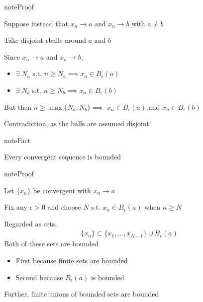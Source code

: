 \documentclass[letterpaper,10pt,english]{jupyterBook}
\begin{document}
\begin{sphinxadmonition}{note}{Proof}

\sphinxAtStartPar
Suppose instead that \(x_n \to a \text{ and } x_n \to b \text{ with } a \ne b \)

\sphinxAtStartPar
Take disjoint \(\epsilon\)\sphinxhyphen{}balls around \(a\) and \(b\)

\begin{figure}[H]
\centering

\noindent{}
\end{figure}

\sphinxAtStartPar
Since \(x_n \to a\) and \(x_n \to b\),
\begin{itemize}
\item {} 
\sphinxAtStartPar
\(\exists \; N_a\) s.t. \(n \geq N_a \implies x_n \in B_{\epsilon}(a)\)

\item {} 
\sphinxAtStartPar
\(\exists \; N_b\) s.t. \(n \geq N_b \implies x_n \in B_{\epsilon}(b)\)

\end{itemize}

\sphinxAtStartPar
But then \(n \geq \max\{N_a, N_b\} \implies \) \(x_n \in B_{\epsilon}(a)\) and \(x_n \in B_{\epsilon}(b)\)

\sphinxAtStartPar
Contradiction, as the balls are assumed disjoint
\end{sphinxadmonition}

\begin{sphinxadmonition}{note}{Fact}

\sphinxAtStartPar
Every convergent sequence is bounded
\end{sphinxadmonition}

\begin{sphinxadmonition}{note}{Proof}

\sphinxAtStartPar
Let \(\{x_n\}\) be convergent with \(x_n \to a\)

\sphinxAtStartPar
Fix any \(\epsilon > 0\) and choose \(N\) s.t. \(x_n \in B_{\epsilon}(a)\) when
\(n \geq N\)

\sphinxAtStartPar
Regarded as sets,
\begin{equation*}
\begin{split}\{x_n\} \subset \{x_1, \ldots, x_{N-1}\} \cup B_{\epsilon}(a)\end{split}
\end{equation*}
\sphinxAtStartPar
Both of these sets are bounded
\begin{itemize}
\item {} 
\sphinxAtStartPar
First because finite sets are bounded

\item {} 
\sphinxAtStartPar
Second because \(B_{\epsilon}(a)\) is bounded

\end{itemize}

\sphinxAtStartPar
Further, finite unions of bounded sets are bounded
\end{sphinxadmonition}
\end{document}
